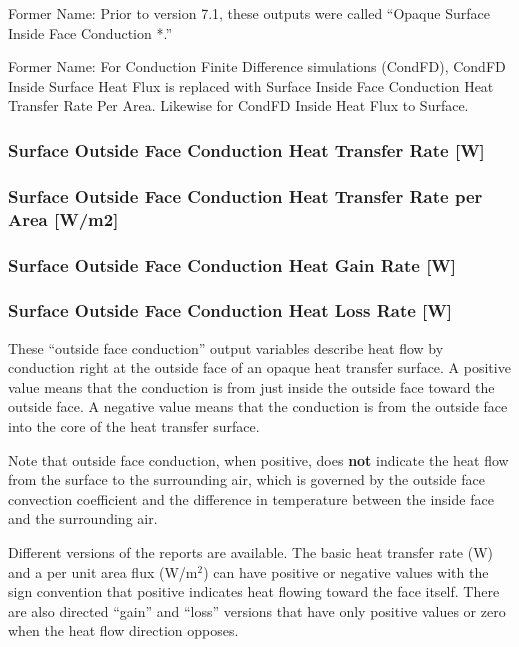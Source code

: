 Former Name: Prior to version 7.1, these outputs were called ``Opaque Surface Inside Face Conduction *.''

Former Name: For Conduction Finite Difference simulations (CondFD), CondFD Inside Surface Heat Flux is replaced with Surface Inside Face Conduction Heat Transfer Rate Per Area. Likewise for CondFD Inside Heat Flux to Surface.

\subsubsection{Surface Outside Face Conduction Heat Transfer Rate {[}W{]}}\label{surface-outside-face-conduction-heat-transfer-rate-w}

\subsubsection{Surface Outside Face Conduction Heat Transfer Rate per Area {[}W/m2{]}}\label{surface-outside-face-conduction-heat-transfer-rate-per-area-wm2}

\subsubsection{Surface Outside Face Conduction Heat Gain Rate {[}W{]}}\label{surface-outside-face-conduction-heat-gain-rate-w}

\subsubsection{Surface Outside Face Conduction Heat Loss Rate {[}W{]}}\label{surface-outside-face-conduction-heat-loss-rate-w}

These ``outside face conduction'' output variables describe heat flow by conduction right at the outside face of an opaque heat transfer surface. A positive value means that the conduction is from just inside the outside face toward the outside face. A negative value means that the conduction is from the outside face into the core of the heat transfer surface.

Note that outside face conduction, when positive, does \textbf{not} indicate the heat flow from the surface to the surrounding air, which is governed by the outside face convection coefficient and the difference in temperature between the inside face and the surrounding air.

Different versions of the reports are available. The basic heat transfer rate (W) and a per unit area flux (W/m\(^{2}\)) can have positive or negative values with the sign convention that positive indicates heat flowing toward the face itself. There are also directed ``gain'' and ``loss'' versions that have only positive values or zero when the heat flow direction opposes.

